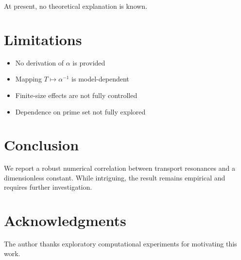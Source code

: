 \documentclass[11pt]{article}
\begin{document}
At present, no theoretical explanation is known.

\section{Limitations}

\begin{itemize}
\item No derivation of $\alpha$ is provided
\item Mapping $T \mapsto \alpha^{-1}$ is model-dependent
\item Finite-size effects are not fully controlled
\item Dependence on prime set not fully explored
\end{itemize}

\section{Conclusion}

We report a robust numerical correlation between transport resonances and a dimensionless constant. While intriguing, the result remains empirical and requires further investigation.

\section*{Acknowledgments}

The author thanks exploratory computational experiments for motivating this work.
\end{document}
